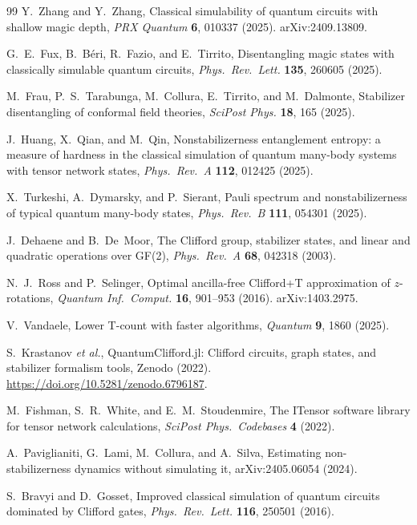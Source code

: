 \documentclass[a4paper,twocolumn,11pt]{quantumarticle}
\begin{document}
\begin{thebibliography}{99}
Y.~Zhang and Y.~Zhang,
Classical simulability of quantum circuits with shallow magic depth,
\textit{PRX Quantum} \textbf{6}, 010337 (2025).
arXiv:2409.13809.

G.~E.~Fux, B.~B\'{e}ri, R.~Fazio, and E.~Tirrito,
Disentangling magic states with classically simulable quantum circuits,
\textit{Phys.\ Rev.\ Lett.} \textbf{135}, 260605 (2025).

M.~Frau, P.~S.~Tarabunga, M.~Collura, E.~Tirrito, and M.~Dalmonte,
Stabilizer disentangling of conformal field theories,
\textit{SciPost Phys.} \textbf{18}, 165 (2025).

J.~Huang, X.~Qian, and M.~Qin,
Nonstabilizerness entanglement entropy: a measure of hardness in the classical simulation of quantum many-body systems with tensor network states,
\textit{Phys.\ Rev.\ A} \textbf{112}, 012425 (2025).

X.~Turkeshi, A.~Dymarsky, and P.~Sierant,
Pauli spectrum and nonstabilizerness of typical quantum many-body states,
\textit{Phys.\ Rev.\ B} \textbf{111}, 054301 (2025).

J.~Dehaene and B.~De~Moor,
The Clifford group, stabilizer states, and linear and quadratic operations over GF(2),
\textit{Phys.\ Rev.\ A} \textbf{68}, 042318 (2003).

N.~J.~Ross and P.~Selinger,
Optimal ancilla-free Clifford+T approximation of $z$-rotations,
\textit{Quantum Inf.\ Comput.} \textbf{16}, 901--953 (2016).
arXiv:1403.2975.

V.~Vandaele,
Lower T-count with faster algorithms,
\textit{Quantum} \textbf{9}, 1860 (2025).

S.~Krastanov \textit{et al.},
QuantumClifford.jl: Clifford circuits, graph states, and stabilizer formalism tools,
Zenodo (2022).
\url{https://doi.org/10.5281/zenodo.6796187}.

M.~Fishman, S.~R.~White, and E.~M.~Stoudenmire,
The ITensor software library for tensor network calculations,
\textit{SciPost Phys.\ Codebases} \textbf{4} (2022).

A.~Paviglianiti, G.~Lami, M.~Collura, and A.~Silva,
Estimating non-stabilizerness dynamics without simulating it,
arXiv:2405.06054 (2024).

S.~Bravyi and D.~Gosset,
Improved classical simulation of quantum circuits dominated by Clifford gates,
\textit{Phys.\ Rev.\ Lett.} \textbf{116}, 250501 (2016).


\end{thebibliography}
\end{document}
